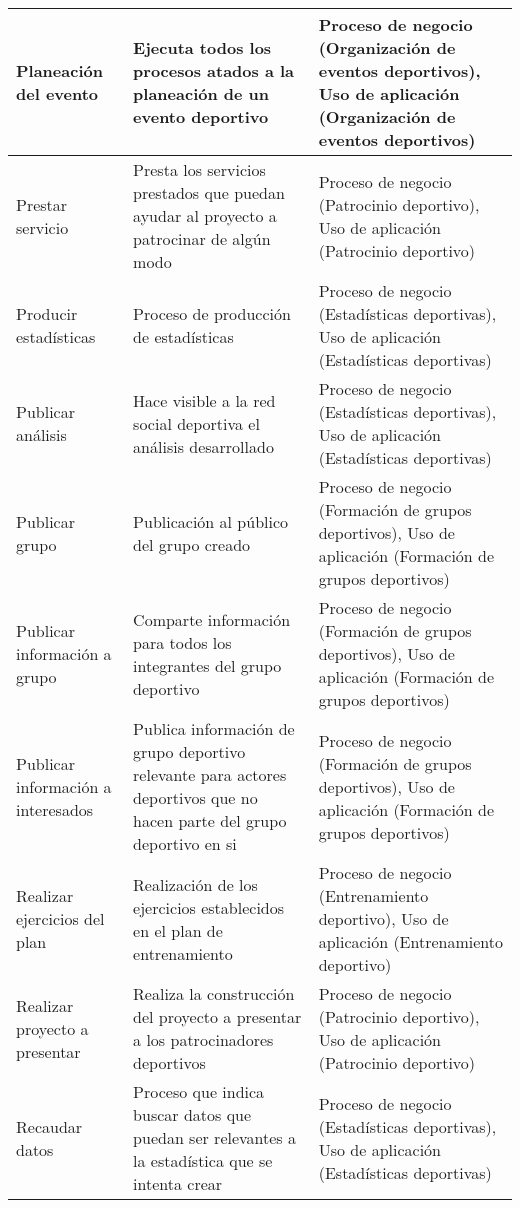 \begin{center}
\begin{longtable}{|p{4cm}|p{7cm}|p{4cm}|}
		\\
		\hline
		Planeación del evento & 
		Ejecuta todos los procesos atados a la planeación de un evento deportivo & 
		Proceso de negocio (Organización de eventos deportivos), Uso de aplicación (Organización de eventos deportivos)
		\\
		\hline
		Prestar servicio & 
		Presta los servicios prestados que puedan ayudar al proyecto a patrocinar de algún modo & 
		Proceso de negocio (Patrocinio deportivo), Uso de aplicación (Patrocinio deportivo)
		\\
		\hline
		Producir estadísticas & 
		Proceso de producción de estadísticas & 
		Proceso de negocio (Estadísticas deportivas), Uso de aplicación (Estadísticas deportivas)
		\\
		\hline
		Publicar análisis & 
		Hace visible a la red social deportiva el análisis desarrollado & 
		Proceso de negocio (Estadísticas deportivas), Uso de aplicación (Estadísticas deportivas)
		\\
		\hline
		Publicar grupo & 
		Publicación al público del grupo creado & 
		Proceso de negocio (Formación de grupos deportivos), Uso de aplicación (Formación de grupos deportivos)
		\\
		\hline
		Publicar información a grupo & 
		Comparte información para todos los integrantes del grupo deportivo & 
		Proceso de negocio (Formación de grupos deportivos), Uso de aplicación (Formación de grupos deportivos)
		\\
		\hline
		Publicar información a interesados & 
		Publica información de grupo deportivo relevante para actores deportivos que no hacen parte del grupo deportivo en si & 
		Proceso de negocio (Formación de grupos deportivos), Uso de aplicación (Formación de grupos deportivos)
		\\
		\hline
		Realizar ejercicios del plan & 
		Realización de los ejercicios establecidos en el plan de entrenamiento & 
		Proceso de negocio (Entrenamiento deportivo), Uso de aplicación (Entrenamiento deportivo)
		\\
		\hline
		Realizar proyecto a presentar & 
		Realiza la construcción del proyecto a presentar a los patrocinadores deportivos & 
		Proceso de negocio (Patrocinio deportivo), Uso de aplicación (Patrocinio deportivo)
		\\
		\hline
		Recaudar datos & 
		Proceso que indica buscar datos que puedan ser relevantes a la estadística que se intenta crear & 
		Proceso de negocio (Estadísticas deportivas), Uso de aplicación (Estadísticas deportivas)
		\\

\end{longtable}
\end{center}
